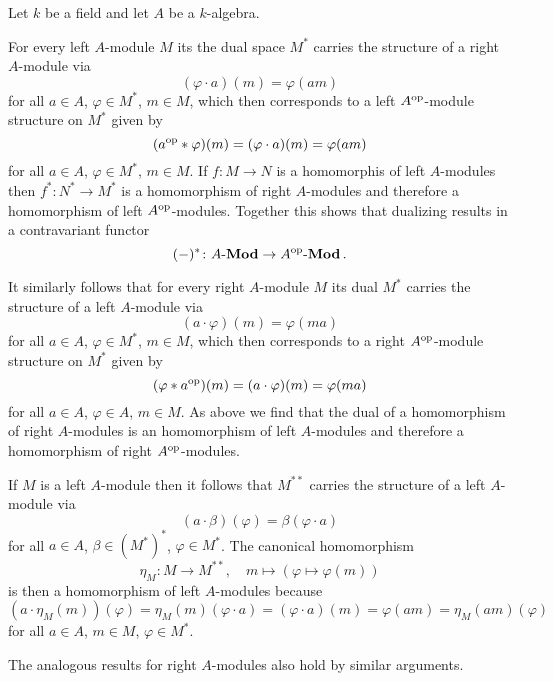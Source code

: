 \begin{example}
  Let $k$ be a field and let $A$ be a $k$-algebra.
  
  For every left $A$-module $M$ its the dual space $M^*$ carries the structure of a right $A$-module via
  \[
      (\varphi \cdot a)(m)
    = \varphi(am)
  \]
  for all $a \in A$, $\varphi \in M^*$, $m \in M$, which then corresponds to a left $A^{\operatorname{op}}$-module structure on $M^*$ given by
  \[
      (a^{\operatorname{op}} * \varphi)(m)
    = (\varphi \cdot a)(m)
    = \varphi(a m)
  \]
  for all $a \in A$, $\varphi \in M^*$, $m \in M$.
  If $f \colon M \to N$ is a homomorphis of left $A$-modules then $f^* \colon N^* \to M^*$ is a homomorphism of right $A$-modules and therefore a homomorphism of left $A^{\operatorname{op}}$-modules.
  Together this shows that dualizing results in a contravariant functor
  \[
            (-)^*
    \colon  A\text{-}\mathbf{Mod}
    \to     A^{\operatorname{op}}\text{-}\mathbf{Mod} \,.
  \]
  
  It similarly follows that for every right $A$-module $M$ its dual $M^*$ carries the structure of a left $A$-module via
  \[
      (a \cdot \varphi)(m)
    = \varphi(m a)
  \]
  for all $a \in A$, $\varphi \in M^*$, $m \in M$, which then corresponds to a right $A^{\operatorname{op}}$-module structure on $M^*$ given by
  \[
      (\varphi * a^{\operatorname{op}})(m)
    = (a \cdot \varphi)(m)
    = \varphi(m a)
  \]
  for all $a \in A$, $\varphi \in A$, $m \in M$.
  As above we find that the dual of a homomorphism of right $A$-modules is an homomorphism of left $A$-modules and therefore a homomorphism of right $A^{\operatorname{op}}$-modules.
  
  If $M$ is a left $A$-module then it follows that $M^{**}$ carries the structure of a left $A$-module via
  \[
      (a \cdot \beta)(\varphi)
    = \beta(\varphi \cdot a)
  \]
  for all $a \in A$, $\beta \in (M^*)^*$, $\varphi \in M^*$.
  The canonical homomorphism
  \[
            \eta_M
    \colon  M
    \to     M^{**},
    \quad   m
    \mapsto (\varphi \mapsto \varphi(m))
  \]
  is then a homomorphism of left $A$-modules because
  \[
      (a \cdot \eta_M(m))(\varphi)
    = \eta_M(m)(\varphi \cdot a)
    = (\varphi \cdot a)(m)
    = \varphi(a m)
    = \eta_M(a m)(\varphi)
  \]
  for all $a \in A$, $m \in M$, $\varphi \in M^*$.
  
  The analogous results for right $A$-modules also hold by similar arguments.


\end{example}
